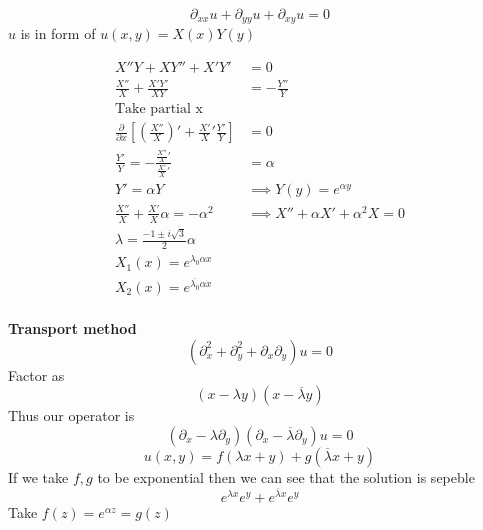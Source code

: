 \documentclass[answers,12pt,addpoints]{exam}
\begin{document}
\begin{questions}
    \\
    $$ \partial_{xx}u + \partial_{yy}u + \partial_{xy}u = 0$$
    $u$ is in form of $u(x,y) = X(x)Y(y)$
    \begin{solution}
        \begin{align*}
            X''Y + XY'' + X'Y' &= 0 \\
            \frac{X''}{X} + \frac{X'Y'}{XY} &= - \frac{Y''}{Y}\\
            \text{Take partial x}\\
            \frac{\partial}{\partial x} \left[ (\frac{X''}{X})' + \frac{X'}{X}' \frac{Y'}{Y}\right] &= 0\\
            \frac{Y'}{Y} = -\frac{\frac{X''}{X}'}{\frac{X'}{X}'} &= \alpha\\
            Y' = \alpha Y &\implies Y(y) = e^{\alpha y}\\
            \frac{X''}{X} + \frac{X'}{X} \alpha = - \alpha^2 &\implies X'' + \alpha X' + \alpha^2 X = 0\\
            \lambda = \frac{-1\pm i\sqrt{3}}{2}\alpha\\
            X_1(x) = e^{\lambda_0 \alpha x}\\
            X_2(x) = e^{\overline{\lambda_0} \alpha x}\\
        \end{align*}

        \textbf{Transport method}
        $$ (\partial_{x}^2 + \partial_{y}^2 + \partial_{x}\partial_{y} )u= 0$$
        Factor as 
        $$ (x-\lambda y )( x - \overline{\lambda} y)$$
        Thus our operator is 
        $$ (\partial_x - \lambda \partial_y)(\partial_x - \overline{\lambda} \partial_y)u = 0$$
        $$u(x,y) = f(\lambda x +y) + g(\overline{\lambda} x + y)$$
        If we take $f, g$ to be exponential then we can see that the solution is sepeble\\
        $$ e^{\lambda x} e^{y} + e^{\overline{\lambda} x} e^{y}$$
        Take $f(z) = e^{\alpha z} = g(z)$


    \end{solution}
\end{questions}
\end{document}
